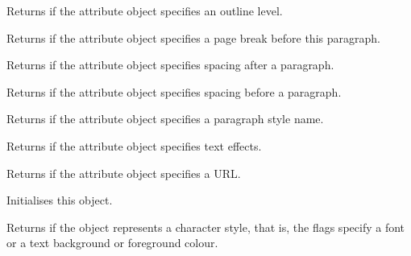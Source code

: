 
Returns \true if the attribute object specifies an outline level.

\label{wxtextattrexhaspagebreak}


Returns \true if the attribute object specifies a page break before this paragraph.

\label{wxtextattrexhasparagraphspacingafter}


Returns \true if the attribute object specifies spacing after a paragraph.

\label{wxtextattrexhasparagraphspacingbefore}


Returns \true if the attribute object specifies spacing before a paragraph.

\label{wxtextattrexhasparagraphstylename}


Returns \true if the attribute object specifies a paragraph style name.

\label{wxtextattrexhastexteffects}


Returns \true if the attribute object specifies text effects.

\label{wxtextattrexhasurl}


Returns \true if the attribute object specifies a URL.

\label{wxtextattrexinit}


Initialises this object.

\label{wxtextattrexischaracterstyle}


Returns \true if the object represents a character style, that is,
the flags specify a font or a text background or foreground colour.

